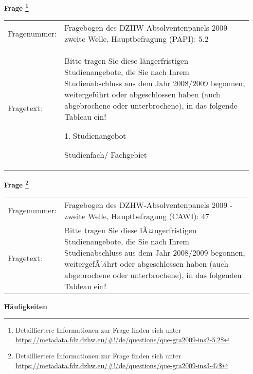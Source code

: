 				\vspace*{0.5cm}
                \noindent\textbf{Frage
	                \footnote{Detailliertere Informationen zur Frage finden sich unter
		              \url{https://metadata.fdz.dzhw.eu/\#!/de/questions/que-gra2009-ins2-5.2$}}}\\
				\begin{tabularx}{\hsize}{@{}lX}
					Fragenummer: &
					  Fragebogen des DZHW-Absolventenpanels 2009 - zweite Welle, Hauptbefragung (PAPI):
					  5.2
 \\
					Fragetext: & Bitte tragen Sie diese längerfristigen Studienangebote, die Sie nach Ihrem Studienabschluss aus dem Jahr 2008/2009 begonnen, weitergeführt oder abgeschlossen haben (auch abgebrochene oder unterbrochene), in das folgende Tableau ein!\par  1. Studienangebot\par  Studienfach/ Fachgebiet \\
				\end{tabularx}
				\vspace*{0.5cm}
                \noindent\textbf{Frage
	                \footnote{Detailliertere Informationen zur Frage finden sich unter
		              \url{https://metadata.fdz.dzhw.eu/\#!/de/questions/que-gra2009-ins3-47$}}}\\
				\begin{tabularx}{\hsize}{@{}lX}
					Fragenummer: &
					  Fragebogen des DZHW-Absolventenpanels 2009 - zweite Welle, Hauptbefragung (CAWI):
					  47
 \\
					Fragetext: & Bitte tragen Sie diese lÃ¤ngerfristigen Studienangebote, die Sie nach Ihrem Studienabschluss aus dem Jahr 2008/2009 begonnen, weitergefÃ¼hrt oder abgeschlossen haben (auch abgebrochene oder unterbrochene), in das folgenden Tableau ein! \\
				\end{tabularx}





        		\vspace*{0.5cm}
                \noindent\textbf{Häufigkeiten}

